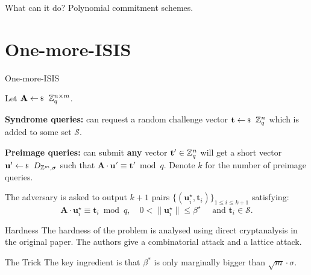 \documentclass[xcolor=table,10pt,aspectratio=169]{beamer}
\renewcommand{\vec}[1]{\ensuremath{\mathbf{#1}}\xspace}
\providecommand{\mat}[1]{\ensuremath{\vec{#1}}\xspace}
\begin{document}
\begin{frame}[label={sec:orgc42ee74}]{What can it do?}
Polynomial commitment schemes.
\end{frame}

\section{One-more-ISIS}
\label{sec:orgde374fa}

\begin{frame}[label={sec:org6a412ad}]{One-more-ISIS}
\begin{definition}
Let \(\mat{A} \sample \ZZ_{q}^{n \times m}\).

\textbf{Syndrome queries:} can request a random challenge vector \(\vec{t} \sample \ZZ_{q}^{n}\) which is added to some set \(\mathcal{S}\).

\textbf{Preimage queries:} can submit \textbf{any} vector \(\vec{t}' \in \ZZ_{q}^{n}\) will get a short vector \(\vec{u}' \sample D_{\ZZ^m,\sigma}\) such that \(\mat{A} \cdot \vec{u}' \equiv \vec{t}' \bmod q\). Denote \(k\) for the number of preimage queries.

The adversary is asked to output \(k+1\) pairs \(\{(\vec{u}^{\star}_i,\vec{t}_i)\}_{1 \le i \leq k+1}\) satisfying:
\[\mat{A}\cdot \vec{u}_{i}^{\star} \equiv \vec{t}_{i} \bmod q,\quad 0 < \|\vec{u}^\star_{i}\| \leq \beta^{\star} \quad \text{ and }\vec{t}_{i} \in \mathcal{S}.\]
\end{definition}

{\footnotesize {} \par}
\end{frame}

\begin{frame}[label={sec:orga6d9aa7}]{Hardness}
The hardness of the problem is analysed using direct cryptanalysis in the original paper. The authors give a combinatorial attack and a lattice attack.

\begin{block}{The Trick}
The key ingredient is that \(\beta^{*}\) is only marginally bigger than \(\sqrt{m} \cdot \sigma\).
\end{block}
\end{frame}
\end{document}
